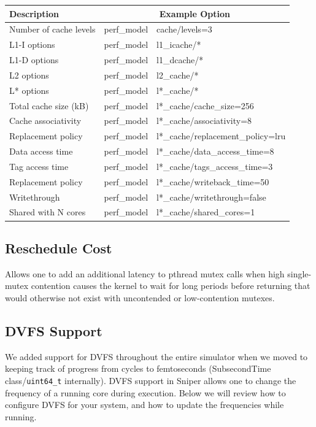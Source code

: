 \documentclass[a4paper,11pt,titlepage]{article}
\newcommand{\sourcecode}[1]{{\tt #1}}
\begin{document}
\begin{tabular}{lr@{/}l} \hline\hline
Description & \multicolumn{2}{c}{Example Option} \\ \hline
Number of cache levels & perf\_model&cache/levels=3 \\
L1-I options & perf\_model&l1\_icache/* \\
L1-D options & perf\_model&l1\_dcache/* \\
L2 options & perf\_model&l2\_cache/* \\
L* options & perf\_model&l*\_cache/* \\
Total cache size (kB) & perf\_model&l*\_cache/cache\_size=256 \\
Cache associativity & perf\_model&l*\_cache/associativity=8 \\
Replacement policy & perf\_model&l*\_cache/replacement\_policy=lru \\
Data access time & perf\_model&l*\_cache/data\_access\_time=8 \\
Tag access time & perf\_model&l*\_cache/tags\_access\_time=3 \\
Replacement policy & perf\_model&l*\_cache/writeback\_time=50 \\
Writethrough & perf\_model&l*\_cache/writethrough=false \\
Shared with N cores & perf\_model&l*\_cache/shared\_cores=1 \\
\hline
\end{tabular}

\subsection{Reschedule Cost}

Allows one to add an additional latency to pthread mutex calls when high single-mutex contention causes the kernel to wait for long
periods before returning that would otherwise not exist with uncontended or low-contention mutexes.

\subsection{DVFS Support}

We added support for DVFS throughout the entire simulator when we moved to keeping track of progress
from cycles to femtoseconds (SubsecondTime class/\sourcecode{uint64\_t} internally).  DVFS support in Sniper allows one to change the frequency
of a running core during execution.  Below we will review how to configure
DVFS for your system, and how to update the frequencies while running.
\end{document}
